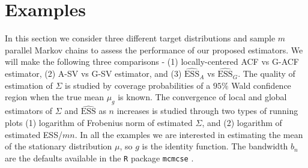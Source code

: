 \documentclass[11pt]{article}
\theoremstyle{remark}
\begin{document}

\section{Examples} \label{sec:examples}

In this section we consider three different target distributions and sample $m$ parallel Markov chains to assess the performance of our proposed estimators. We will make the following three comparisons - (1) locally-centered ACF vs G-ACF estimator, (2) A-SV vs G-SV estimator, and (3) $\widehat{\textrm{ESS}}_A$ vs $\widehat{\textrm{ESS}}_G$. The quality of estimation of $\Sigma$ is studied by coverage probabilities of a $95 \%$ Wald  confidence region when the true mean $\mu_g$ is known. The convergence of local and global estimators of $\Sigma$ and $\widehat{\textrm{ESS}}$ as $n$ increases is studied through two types of running plots (1) logarithm of Frobenius norm of estimated $\Sigma$, and (2) logarithm of estimated ESS/$mn$. In all the examples we are interested in estimating the mean of the stationary distribution $\mu$, so $g$ is the identity function. The bandwidth $b_n$ are the defaults available in the \texttt{R} package \texttt{mcmcse} \citep{mcmcse}.

\end{document}
